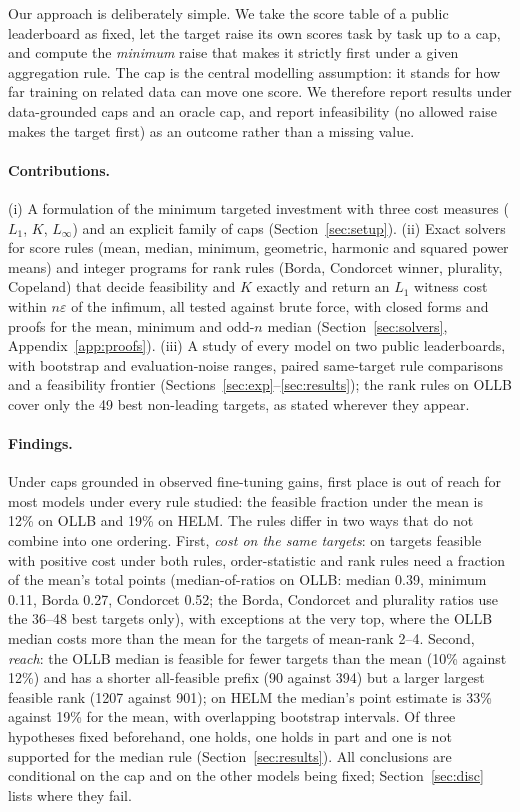 \documentclass{article}
\begin{document}
Our approach is deliberately simple. We take the score table of a public leaderboard as fixed, let the target raise its own scores task by task up to a cap, and compute the \emph{minimum} raise that makes it strictly first under a given aggregation rule. The cap is the central modelling assumption: it stands for how far training on related data can move one score. We therefore report results under data-grounded caps and an oracle cap, and report infeasibility (no allowed raise makes the target first) as an outcome rather than a missing value.

\paragraph{Contributions.}
(i) A formulation of the minimum targeted investment with three cost measures ($L_1$, $K$, $L_\infty$) and an explicit family of caps (Section~\ref{sec:setup}). (ii) Exact solvers for score rules (mean, median, minimum, geometric, harmonic and squared power means) and integer programs for rank rules (Borda, Condorcet winner, plurality, Copeland) that decide feasibility and $K$ exactly and return an $L_1$ witness cost within $n\varepsilon$ of the infimum, all tested against brute force, with closed forms and proofs for the mean, minimum and odd-$n$ median (Section~\ref{sec:solvers}, Appendix~\ref{app:proofs}). (iii) A study of every model on two public leaderboards, with bootstrap and evaluation-noise ranges, paired same-target rule comparisons and a feasibility frontier (Sections~\ref{sec:exp}--\ref{sec:results}); the rank rules on OLLB cover only the 49 best non-leading targets, as stated wherever they appear.

\paragraph{Findings.}
Under caps grounded in observed fine-tuning gains, first place is out of reach for most models under every rule studied: the feasible fraction under the mean is 12\% on OLLB and 19\% on HELM. The rules differ in two ways that do not combine into one ordering. First, \emph{cost on the same targets}: on targets feasible with positive cost under both rules, order-statistic and rank rules need a fraction of the mean's total points (median-of-ratios on OLLB: median 0.39, minimum 0.11, Borda 0.27, Condorcet 0.52; the Borda, Condorcet and plurality ratios use the 36--48 best targets only), with exceptions at the very top, where the OLLB median costs more than the mean for the targets of mean-rank 2--4. Second, \emph{reach}: the OLLB median is feasible for fewer targets than the mean (10\% against 12\%) and has a shorter all-feasible prefix (90 against 394) but a larger largest feasible rank (1207 against 901); on HELM the median's point estimate is 33\% against 19\% for the mean, with overlapping bootstrap intervals. Of three hypotheses fixed beforehand, one holds, one holds in part and one is not supported for the median rule (Section~\ref{sec:results}). All conclusions are conditional on the cap and on the other models being fixed; Section~\ref{sec:disc} lists where they fail.
\end{document}
